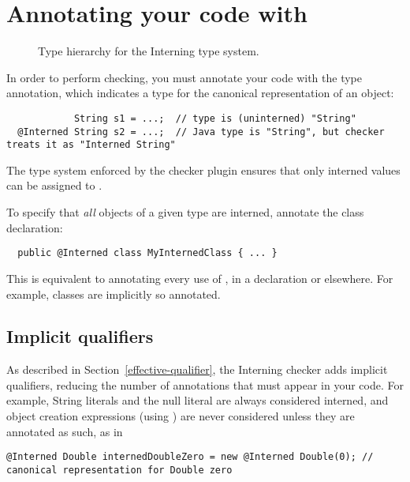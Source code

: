 \section{Annotating your code with \label{annotating-with-interned}}

\begin{figure}
\caption{Type hierarchy for the Interning type system.}
\label{fig:interning-hierarchy}
\end{figure}

In order to perform checking, you must annotate your code with the 
type annotation, which indicates a type for the canonical representation of an
object:

\begin{Verbatim}
            String s1 = ...;  // type is (uninterned) "String"
  @Interned String s2 = ...;  // Java type is "String", but checker treats it as "Interned String"
\end{Verbatim}

The type system enforced by the checker plugin ensures that only interned
values can be assigned to .

To specify that \emph{all} objects of a given type are interned, annotate the
class declaration:

\begin{Verbatim}
  public @Interned class MyInternedClass { ... }
\end{Verbatim}

This is equivalent to annotating every use of , in a
declaration or elsewhere.  For example,  classes are implicitly
so annotated.


\subsection{Implicit qualifiers\label{interning-implicit-qualifiers}}

As described in Section~\ref{effective-qualifier}, the Interning checker
adds implicit qualifiers, reducing the number of annotations that must
appear in your code.
For example, String literals and the null literal are always considered interned, and
object creation expressions (using ) are never considered
 unless they are annotated as such, as in

\begin{smaller}
\begin{Verbatim}
@Interned Double internedDoubleZero = new @Interned Double(0); // canonical representation for Double zero
\end{Verbatim}
\end{smaller}

